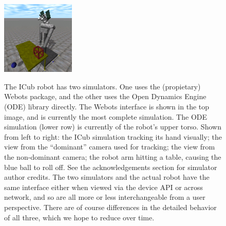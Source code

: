 \begin{figure}[tbp]
{\includegraphics[width=3.5cm]{sim-ode-knock}
}
\caption{
%
The ICub robot has two simulators.
One uses the (propietary) Webots package, and the other uses
the Open Dynamics Engine (ODE) library directly.
The Webots interface is shown in the top image, and is currently
the most complete simulation.  The ODE simulation (lower row)
is currently of the robot's upper torso.  Shown from left to
right: the ICub simulation tracking its hand visually;
the view from the ``dominant'' camera used for tracking; the
view from the non-dominant camera; the robot arm hitting
a table, causing the blue ball to roll off.
%
See the acknowledgements section for simulator author credits.
%
The two simulators and the actual robot have the same interface either
when viewed via the device API or across network, and so
are all more or less interchangeable from a user perspective.
%
%
There are of course
differences in the detailed behavior of all three, which we hope to
reduce over time.
%
} 
\label{fig:simulators}
\end{figure}

